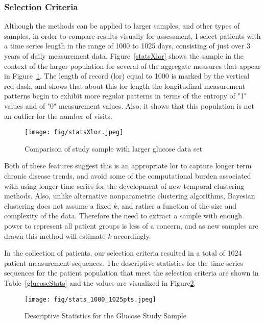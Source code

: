 \subsubsection{Selection Criteria}
Although the methods can be applied to larger samples, and other types of samples, in order to compare results visually for assessment, I select patients with a time series length in the range of 1000 to 1025 days, consisting of just over 3 years of daily measurement data.  Figure~\ref{statsXlor} shows the sample in the context of the larger population for several of the aggregate measures that appear in Figure~\ref{desc_glucose}.  The length of record (lor) equal to 1000 is marked by the vertical red dash, and shows that about this lor length the longitudinal measurement patterns begin to exhibit more regular patterns in terms of the entropy of "1" values and of "0" measurement values.  Also, it shows that this population is not an outlier for the number of visits.

\begin{figure}[ht]
  \centering
  \texttt{[image: fig/statsXlor.jpeg]}\\
  \caption{Comparison of study sample with larger glucose data set}\label{desc_glucose}
\end{figure}

Both of these features suggest this is an appropriate lor to capture longer term chronic disease trends, and avoid some of the computational burden associated with using longer time series for the development of new temporal clustering methods.  Also, unlike alternative nonparametric clustering algorithms, Bayesian clustering does not assume a fixed $k$, and rather a  function of the size and complexity of the data. Therefore the need to extract a sample with enough power to represent all patient groups is less of a concern, and as new samples are drawn this method will estimate $k$ accordingly.

In the collection of patients, our selection criteria resulted in a total of 1024 patient measurement sequences.  The descriptive statistics for the time series sequences for the patient population that meet the selection criteria are shown in Table~\ref{glucoseStats} and the values are visualized in Figure\ref{stats_1000_1025pts}.

\begin{figure}[ht]
  \centering
  \texttt{[image: fig/stats\_1000\_1025pts.jpeg]}\\
  \caption{Descriptive Statistics for the Glucose Study Sample}\label{stats_1000_1025pts}
\end{figure}


